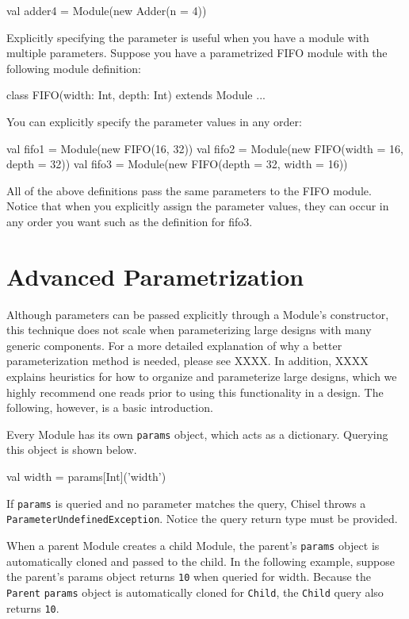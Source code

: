\begin{scala}
val adder4 = Module(new Adder(n = 4))
\end{scala}

Explicitly specifying the parameter is useful when you have a module with multiple parameters. Suppose you have a parametrized FIFO module with the following module definition:

\begin{scala}
class FIFO(width: Int, depth: Int) extends Module {...}
\end{scala}

You can explicitly specify the parameter values in any order:

\begin{scala}
val fifo1 = Module(new FIFO(16, 32))
val fifo2 = Module(new FIFO(width = 16, depth = 32))
val fifo3 = Module(new FIFO(depth = 32, width = 16))
\end{scala}

All of the above definitions pass the same parameters to the FIFO module. Notice that when you explicitly assign the parameter values, they can occur in any order you want such as the definition for fifo3.

\section{Advanced Parametrization}

Although parameters can be passed explicitly through a Module's constructor, this technique does not scale when parameterizing large designs with many generic components. For a more detailed explanation of why a better parameterization method is needed, please see XXXX. In addition, XXXX explains heuristics for how to organize and parameterize large designs, which we highly recommend one reads prior to using this functionality in a design. The following, however, is a basic introduction.

Every Module has its own \verb+params+ object, which acts as a dictionary. Querying this object is shown below.

\begin{scala}
val width = params[Int]('width')
\end{scala}

If \verb+params+ is queried and no parameter matches the query, Chisel throws a \verb+ParameterUndefinedException+. Notice the query return type must be provided.

When a parent Module creates a child Module, the parent's \verb+params+ object is automatically cloned and passed to the child. In the following example, suppose the parent's params object returns \verb+10+ when queried for width. Because the \verb+Parent+ \verb+params+ object is automatically cloned for \verb+Child+, the \verb+Child+ query also returns \verb+10+.

